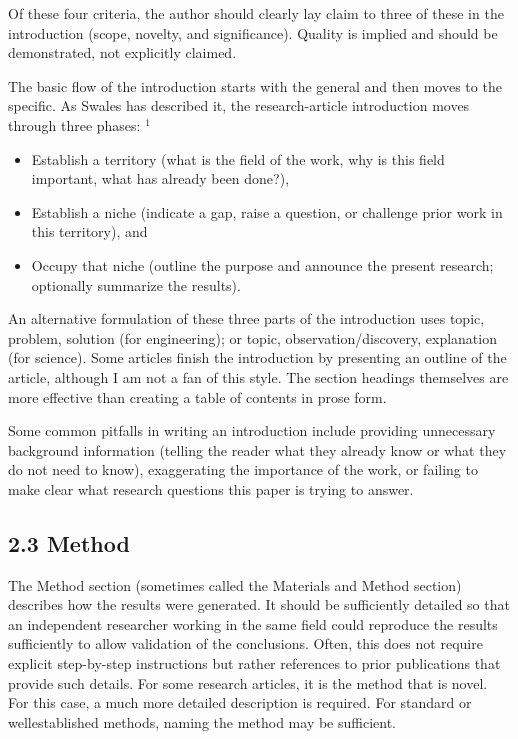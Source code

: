 Of these four criteria, the author should clearly lay claim to three of these in the introduction (scope, novelty, and significance). Quality is implied and should be demonstrated, not explicitly claimed.

The basic flow of the introduction starts with the general and then moves to the specific. As Swales has described it, the research-article introduction moves through three phases: ${ }^{1}$

\begin{itemize}
  \item Establish a territory (what is the field of the work, why is this field important, what has already been done?),
  \item Establish a niche (indicate a gap, raise a question, or challenge prior work in this territory), and
  \item Occupy that niche (outline the purpose and announce the present research; optionally summarize the results).
\end{itemize}

An alternative formulation of these three parts of the introduction uses topic, problem, solution (for engineering); or topic, observation/discovery, explanation (for science). Some articles finish the introduction by presenting an outline of the article, although I am not a fan of this style. The section headings themselves are more effective than creating a table of contents in prose form.

Some common pitfalls in writing an introduction include providing unnecessary background information (telling the reader what they already know or what they do not need to know), exaggerating the importance of the work, or failing to make clear what research questions this paper is trying to answer.

\subsection*{2.3 Method}
The Method section (sometimes called the Materials and Method section) describes how the results were generated. It should be sufficiently detailed so that an independent researcher working in the same field could reproduce the results sufficiently to allow validation of the conclusions. Often, this does not require explicit step-by-step instructions but rather references to prior publications that provide such details. For some research articles, it is the method that is novel. For this case, a much more detailed description is required. For standard or wellestablished methods, naming the method may be sufficient.

